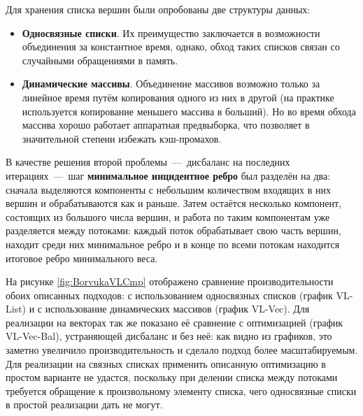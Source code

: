 \documentclass[a4paper,12pt]{extarticle}
\begin{document}
Для хранения списка вершин были опробованы две структуры данных:
\begin{itemize}
	\item \textbf{Односвязные списки}. Их преимущество заключается в возможности объединения за константное время, однако, обход таких списков связан со случайными обращениями в память.
	\item \textbf{Динамические массивы}. Объединение массивов возможно только за линейное время путём копирования одного из них в другой (на практике используется копирование меньшего массива в больший). Но во время обхода массива хорошо работает аппаратная предвыборка, что позволяет в значительной степени избежать кэш-промахов.
\end{itemize}

В качестве решения второй проблемы~---~дисбаланс на последних итерациях~---~шаг \textbf{минимальное инцидентное ребро} был разделён на два: сначала выделяются компоненты с небольшим количеством входящих в них вершин и обрабатываются как и раньше. Затем остаётся несколько компонент, состоящих из большого числа вершин, и работа по таким компонентам уже разделяется между потоками: каждый поток обрабатывает свою часть вершин, находит среди них минимальное ребро и в конце по всеми потокам находится итоговое ребро минимального веса.

На рисунке \ref{fig:BorvukaVLCmp} отображено сравнение производительности обоих описанных подходов: с использованием односвязных списков (график VL-List) и с использование динамических массивов (график VL-Vec).
Для реализации на векторах так же показано её сравнение с оптимизацией (график VL-Vec-Bal), устраняющей дисбаланс и без неё: как видно из графиков, это заметно увеличило производительность и сделало подход более масштабируемым. 
Для реализации на связных списках применить описанную оптимизацию в простом варианте не удастся, поскольку при делении списка между потоками требуется обращение к произвольному элементу списка, чего односвязные списки в простой реализации дать не могут.
\end{document}
